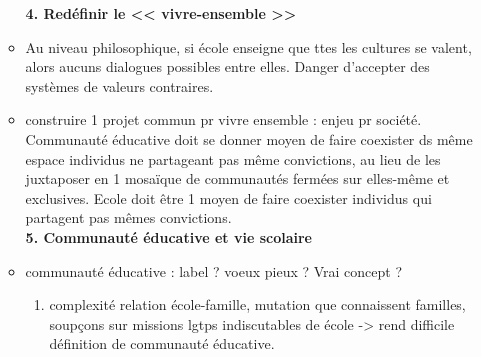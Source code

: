 \documentclass[12pt]{report}
\begin{document}
\begin{itemize}
\begin{itemize}
\textbf{4. Redéfinir le << vivre-ensemble >>} \\

\item  Au niveau philosophique, si école enseigne que ttes les cultures se valent, alors aucuns dialogues possibles entre elles. Danger d'accepter des systèmes de valeurs contraires. \\


\item construire 1 projet commun pr vivre ensemble : enjeu pr société. Communauté éducative doit se donner moyen de faire coexister ds même espace individus ne partageant pas même convictions, au lieu de les juxtaposer en 1 mosaïque de communautés fermées sur elles-même et exclusives. Ecole doit être 1 moyen de faire coexister individus qui partagent pas mêmes convictions.\\

\textbf{5. Communauté éducative et vie scolaire}\\

\item communauté éducative : label ? voeux pieux ? Vrai concept ?
\begin{enumerate}
\item complexité relation école-famille, mutation que connaissent familles, soupçons sur missions lgtps indiscutables de école -> rend difficile définition de communauté éducative.\\
\end{enumerate}


\end{itemize}
\end{itemize}
\end{document}
